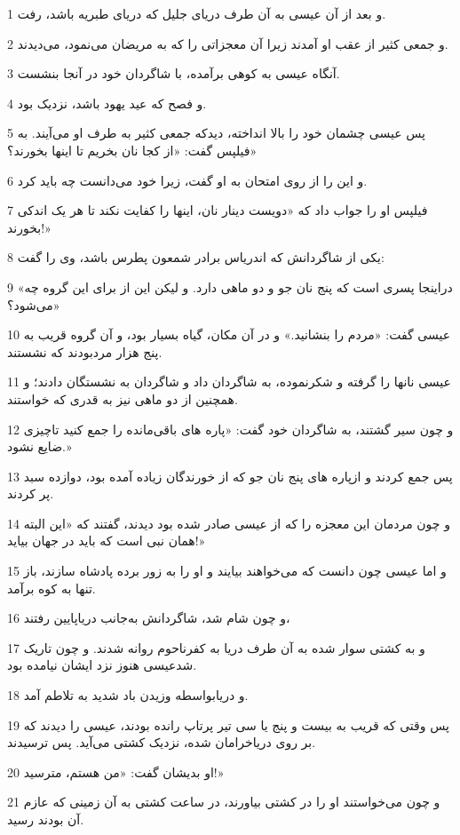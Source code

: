 \par 1 و بعد از آن عیسی به آن طرف دریای جلیل که دریای طبریه باشد، رفت.
\par 2 و جمعی کثیر از عقب او آمدند زیرا آن معجزاتی را که به مریضان می‌نمود، می‌دیدند.
\par 3 آنگاه عیسی به کوهی برآمده، با شاگردان خود در آنجا بنشست.
\par 4 و فصح که عید یهود باشد، نزدیک بود.
\par 5 پس عیسی چشمان خود را بالا انداخته، دیدکه جمعی کثیر به طرف او می‌آیند. به فیلپس گفت: «از کجا نان بخریم تا اینها بخورند؟»
\par 6 و این را از روی امتحان به او گفت، زیرا خود می‌دانست چه باید کرد.
\par 7 فیلپس او را جواب داد که «دویست دینار نان، اینها را کفایت نکند تا هر یک اندکی بخورند!»
\par 8 یکی از شاگردانش که اندریاس برادر شمعون پطرس باشد، وی را گفت:
\par 9 «دراینجا پسری است که پنج نان جو و دو ماهی دارد. و لیکن این از برای این گروه چه می‌شود؟»
\par 10 عیسی گفت: «مردم را بنشانید.» و در آن مکان، گیاه بسیار بود، و آن گروه قریب به پنج هزار مردبودند که نشستند.
\par 11 عیسی نانها را گرفته و شکرنموده، به شاگردان داد و شاگردان به نشستگان دادند؛ و همچنین از دو ماهی نیز به قدری که خواستند.
\par 12 و چون سیر گشتند، به شاگردان خود گفت: «پاره های باقی‌مانده را جمع کنید تاچیزی ضایع نشود.»
\par 13 پس جمع کردند و ازپاره های پنج نان جو که از خورندگان زیاده آمده بود، دوازده سبد پر کردند.
\par 14 و چون مردمان این معجزه را که از عیسی صادر شده بود دیدند، گفتند که «این البته همان نبی است که باید در جهان بیاید!»
\par 15 و اما عیسی چون دانست که می‌خواهند بیایند و او را به زور برده پادشاه سازند، باز تنها به کوه برآمد.
\par 16 و چون شام شد، شاگردانش به‌جانب دریاپایین رفتند،
\par 17 و به کشتی سوار شده به آن طرف دریا به کفرناحوم روانه شدند. و چون تاریک شدعیسی هنوز نزد ایشان نیامده بود.
\par 18 و دریابواسطه وزیدن باد شدید به تلاطم آمد.
\par 19 پس وقتی که قریب به بیست و پنج یا سی تیر پرتاپ رانده بودند، عیسی را دیدند که بر روی دریاخرامان شده، نزدیک کشتی می‌آید. پس ترسیدند.
\par 20 او بدیشان گفت: «من هستم، مترسید!»
\par 21 و چون می‌خواستند او را در کشتی بیاورند، در ساعت کشتی به آن زمینی که عازم آن بودند رسید.
